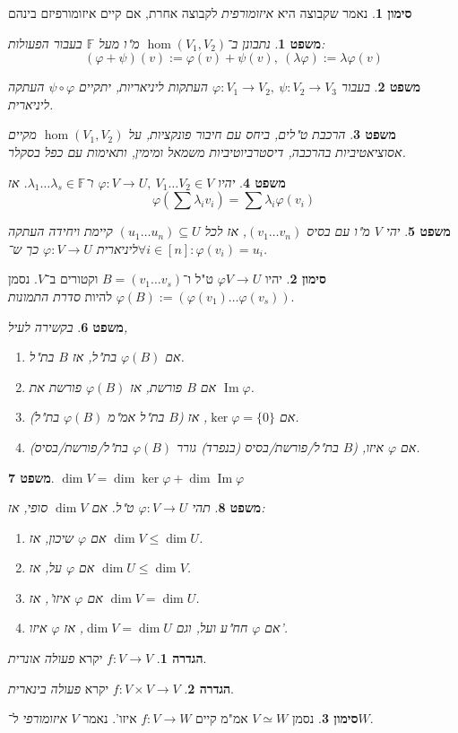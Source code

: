 \documentclass[]{article}
\DeclareMathOperator\Img   {Im}
\newcommand\F         {\mathbb{F}}
\newcommand\co        {\colon}
\renewcommand\lg      {\lambda}
\newcommand\cl [1]    {\left ( #1 \right )}
\renewcommand\phi     {\varphi}
\newtheorem{Theorem}{משפט}
\theoremstyle{definition}
\newtheorem{definition}{הגדרה}
\newtheorem{Notion}{סימון}
\newcommand\theo  [1] {\begin{Theorem}#1\end{Theorem}}
\newcommand\defi  [1] {\begin{definition}#1\end{definition}}
\newcommand\noti  [1] {\begin{Notion}#1\end{Notion}}
\begin{document}
\begin{multicols}{2}
{\begin{enumerate}
		\end{enumerate}}
		\noti{נאמר שקבוצה היא \textit{איזומורפית} לקבוצה אחרת, אם קיים איזומורפיזם בינהם}
		\theo{נתבונן ב־$\hom(V_1, V_2)$ מ"ו מעל $\F$ בעבור הפעולות: 
		\[ (\phi + \psi)(v) := \phi(v) + \psi(v), \ (\lg\phi) := \lg\phi(v) \]}
		\theo{בעבור $\phi \co V_1 \to V_2, \ \psi \co V_2 \to V_3$ העתקות ליניאריות, יתקיים $\psi \circ \phi$ העתקה ליניארית. }
		\theo{הרכבת ט"לים, ביחס עם חיבור פונקציות, על $\hom(V_1, V_2)$ מקיים אסוציאטיביות בהרכבה, דיסטרביוטיביות משמאל ומימין, ותאימות עם כפל בסקלר. }
		\theo{יהיו $\phi \co V \to U, \ V_1 \dots V_2 \in V$ ו־$\lg_1 \dots \lg_s \in \F$. אז 
		\[ \phi\cl{\sum\lg_iv_i} = \sum\lg_i\phi(v_i) \]}
		\theo{יהי $V$ מ"ו עם בסיס $(v_1 \dots v_n)$, אז לכל $(u_1 \dots u_n) \subseteq U$ קיימת ויחידה העתקה ליניארית $\phi \co V \to U$ כך ש־$\forall i \in [n] \co \phi(v_i) = u_i$. }
		\noti{יהיו $\phi V \to U$ ט"ל ו־$B = (v_1 \dots v_s)$ וקטורים ב־$V$. נסמן $\phi(B) := (\phi(v_1) \dots \phi(v_s))$ להיות \textit{סדרת התמונות}. }
		\theo{בקשירה לעיל, 
		\begin{enumerate}
			\item אם $\phi(B)$ בת"ל, אז $B$ בת"ל. 
			\item אם $B$ פורשת, אז $\phi(B)$ פורשת את $\Img\phi$. 
			\item אם $\ker\phi = \{0\}$, אז ($B$ בת"ל אמ"מ $\phi(B)$ בת"ל). 
			\item אם $\phi$ איזו, ($B$ בת"ל/פורשת/בסיס (בנפרד) גורר $\phi(B)$ בת"ל/פורשת/בסיס). 
		\end{enumerate}}
		\theo{\hfil $\dim V = \dim \ker\phi + \dim\Img\phi$}
		\theo{תהי $\phi \co V \to U$ ט"ל. אם $\dim V$ סופי, אז: 
		\begin{enumerate}
			\item אם $\phi$ שיכון, אז $\dim V \le \dim U$. 
			\item אם $\phi$ על, אז $\dim U \le \dim V$. 
			\item אם $\phi$ איזו', אז $\dim V = \dim U$. 
			\item אם $\phi$ חח"ע ועל, וגם $\dim V = \dim U$, אז $\phi$ איזו'. 
		\end{enumerate}}
		\defi{$f \co V \to V$ יקרא \textit{פעולה אונרית}. }
		\defi{$f \co V \times V \to V$ יקרא \textit{פעולה בינארית}. }
		\noti{נסמן $V \simeq W$ אמ"מ קיים $f \co V \to W$ איזו'. נאמר $V$ \textit{איזומורפי} ל־$W$. }
		

\end{multicols}
\end{document}
